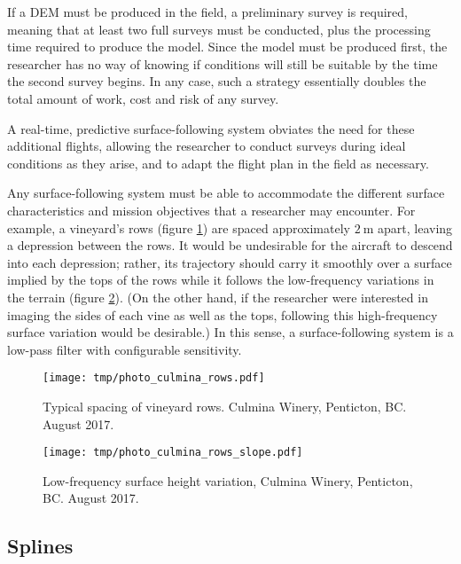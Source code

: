 \documentclass[doc]{apa6}
\begin{document}
If a DEM must be produced in the field, a preliminary survey is required, meaning that at least two full surveys must be conducted, plus the processing time required to produce the model. Since the model must be produced first, the researcher has no way of knowing if conditions will still be suitable by the time the second survey begins. In any case, such a strategy essentially doubles the total amount of work, cost and risk of any survey. 

A real-time, predictive surface-following system obviates the need for these additional flights, allowing the researcher to conduct surveys during ideal conditions as they arise, and to adapt the flight plan in the field as necessary.

Any surface-following system must be able to accommodate the different surface characteristics and mission objectives that a researcher may encounter. For example, a vineyard's rows (figure \ref{fig:photo_culmina_rows}) are spaced approximately $\SI{2}\m$ apart, leaving a depression between the rows. It would be undesirable for the aircraft to descend into each depression; rather, its trajectory should carry it smoothly over a surface implied by the tops of the rows while it follows the low-frequency variations in the terrain (figure \ref{fig:photo_culmina_rows_slope}). (On the other hand, if the researcher were interested in imaging the sides of each vine as well as the tops, following this high-frequency surface variation would be desirable.) In this sense, a surface-following system is a low-pass filter with configurable sensitivity. 

\begin{figure} %
\texttt{[image: tmp/photo\_culmina\_rows.pdf]} 
\caption{Typical spacing of vineyard rows. Culmina Winery, Penticton, BC. August 2017.}
\label{fig:photo_culmina_rows}
\end{figure}

\begin{figure} %
\texttt{[image: tmp/photo\_culmina\_rows\_slope.pdf]} 
\caption{Low-frequency surface height variation, Culmina Winery, Penticton, BC. August 2017.}
\label{fig:photo_culmina_rows_slope}
\end{figure}


\subsection{Splines}
\end{document}
